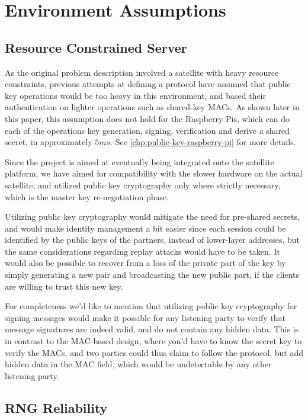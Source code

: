 \section{Environment Assumptions}\label{sec:environment_assumptions}

    \subsection{Resource Constrained Server}

As the original problem description involved a satellite with heavy resource constraints, previous attempts at defining a protocol have assumed that public key operations would be too heavy in this environment, and based their authentication on lighter operations such as shared-key MACs. As shown later in this paper, this assumption does not hold for the Raspberry Pis, which can do each of the operations key generation, signing, verification and derive a shared secret, in approximately \( 5 ms \). See \autoref{chp:public-key-raspberry-pi} for more details.

Since the project is aimed at eventually being integrated onto the satellite platform, we have aimed for compatibility with the slower hardware on the actual satellite, and utilized public key cryptography only where strictly necessary, which is the master key re-negotiation phase.

Utilizing public key cryptography would mitigate the need for pre-shared secrets, and would make identity management a bit easier since each session could be identified by the public keys of the partners, instead of lower-layer addresses, but the same considerations regarding replay attacks would have to be taken. It would also be possible to recover from a loss of the private part of the key by simply generating a new pair and broadcasting the new public part, if the clients are willing to trust this new key.

For completeness we'd like to mention that utilizing public key cryptography for signing messages would make it possible for any listening party to verify that message signatures are indeed valid, and do not contain any hidden data. This is in contrast to the MAC-based design, where you'd have to know the secret key to verify the MACs, and two parties could thus claim to follow the protocol, but add hidden data in the MAC field, which would be undetectable by any other listening party.


    \subsection{RNG Reliability}

